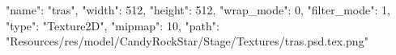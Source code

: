 {
  "name": "tras",
  "width": 512,
  "height": 512,
  "wrap_mode": 0,
  "filter_mode": 1,
  "type": "Texture2D",
  "mipmap": 10,
  "path": "Resources/res/model/CandyRockStar/Stage/Textures/tras.psd.tex.png"
}